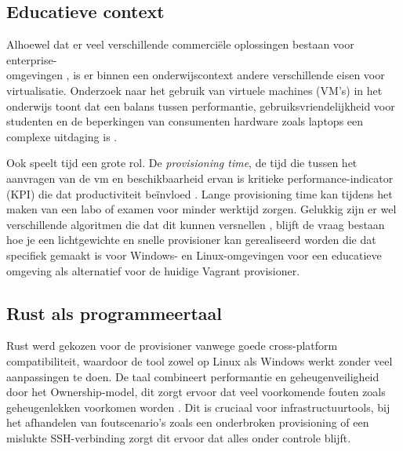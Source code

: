 \subsection{Educatieve context}
Alhoewel dat er veel verschillende commerciële oplossingen bestaan voor enterprise-\\omgevingen \autocite{Portworx2025}, is er binnen een onderwijscontext andere verschillende eisen voor virtualisatie. Onderzoek naar het gebruik van virtuele machines (VM's) in het onderwijs toont dat een balans tussen performantie, gebruiksvriendelijkheid voor studenten en de beperkingen van consumenten hardware zoals laptops een complexe uitdaging is \autocite{Robison2012}.

Ook speelt tijd een grote rol. De \emph{provisioning time}, de tijd die tussen het aanvragen van de vm en beschikbaarheid ervan is kritieke performance-indicator (KPI) die dat productiviteit beïnvloed \autocite{KpiDepot2024}. Lange provisioning time kan tijdens het maken van een labo of examen voor minder werktijd zorgen. Gelukkig zijn er wel verschillende algoritmen die dat dit kunnen versnellen \autocite{jcai2020p208,Lo2014}, blijft de vraag bestaan hoe je een lichtgewichte en snelle provisioner kan gerealiseerd worden die dat specifiek gemaakt is voor Windows- en Linux-omgevingen voor een educatieve omgeving als alternatief voor de huidige Vagrant provisioner.


\subsection{Rust als programmeertaal}
Rust werd gekozen voor de provisioner vanwege goede cross-platform compatibiliteit, waardoor de tool zowel op Linux als Windows werkt zonder veel aanpassingen te doen. De taal combineert performantie en geheugenveiligheid door het Ownership-model, dit zorgt ervoor dat veel voorkomende fouten zoals geheugenlekken voorkomen worden \autocite{Micah2023,Klabnik2018}. Dit is cruciaal voor infrastructuurtools, bij het afhandelen van foutscenario's zoals een onderbroken provisioning of een mislukte SSH-verbinding zorgt dit ervoor dat alles onder controle blijft\autocite{Micah2023}.


